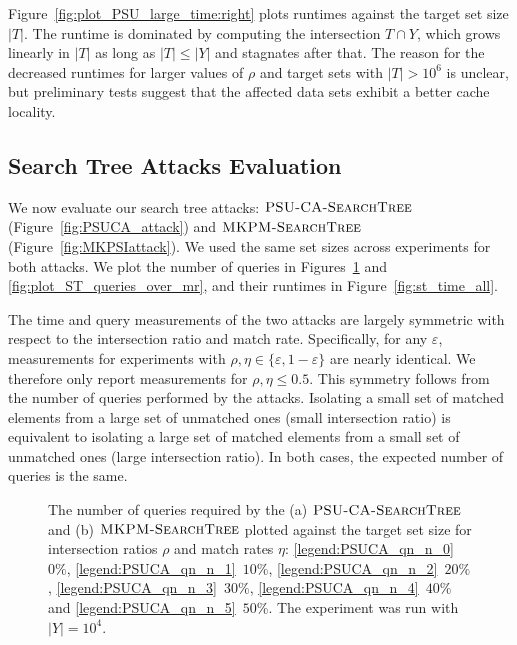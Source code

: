 Figure~\ref{fig:plot_PSU_large_time:right} plots runtimes against the target set size $|T|$.
The runtime is dominated by computing the intersection $T \cap Y$,
which grows linearly in $|T|$ as long as $|T| \leq |Y|$ and stagnates after that.
The reason for the decreased runtimes for larger values of $\rho$ and target sets with $|T|>10^6$ is unclear, but preliminary tests suggest that the affected data sets exhibit a better cache locality.

\subsection{Search Tree Attacks Evaluation}
We now evaluate our search tree attacks: $\textsc{PSU\mbox{-}CA\mbox{-}SearchTree}$ (Figure~\ref{fig:PSUCA_attack}) and $\textsc{MKPM\mbox{-}SearchTree}$ (Figure~\ref{fig:MKPSIattack}). We used the same set sizes across experiments for both attacks.
We plot the number of queries in Figures~\ref{fig:plot_ST_queries_over_n} and \ref{fig:plot_ST_queries_over_mr},
and their runtimes in Figure~\ref{fig:st_time_all}.

The time and query measurements of the two attacks are largely symmetric with respect to the intersection ratio and match rate.
Specifically, for any $\varepsilon$, measurements for experiments with $\rho, \eta \in \{\varepsilon, 1-\varepsilon\}$ are nearly identical. We therefore only report measurements for $\rho, \eta \leq 0.5$. This symmetry follows from the number of queries performed by the attacks. Isolating a small set of matched elements from a large set of unmatched ones (small intersection ratio) is equivalent to isolating a large set of matched elements from a small set of unmatched ones (large intersection ratio). In both cases, the expected number of queries is the same.


\begin{figure}
	\centering
    \subfloat[\PSUCAattack\label{fig:plot_ST_queries_over_nt:left}]{
	
    }
	\caption{The number of queries required by the (a) $\textsc{PSU\mbox{-}CA\mbox{-}SearchTree}${} and (b) $\textsc{MKPM\mbox{-}SearchTree}$ plotted against the target set size 
	for intersection ratios $\rho$ and match rates $\eta$: \ref{legend:PSUCA_qn_n_0}~$0\%$, \ref{legend:PSUCA_qn_n_1}~$10\%$, \ref{legend:PSUCA_qn_n_2}~$20\%$, \ref{legend:PSUCA_qn_n_3}~$30\%$, \ref{legend:PSUCA_qn_n_4}~$40\%$ and \ref{legend:PSUCA_qn_n_5}~$50\%$.
	The experiment was run with $|Y| = 10^4$.}\label{fig:plot_ST_queries_over_n}
\end{figure}



